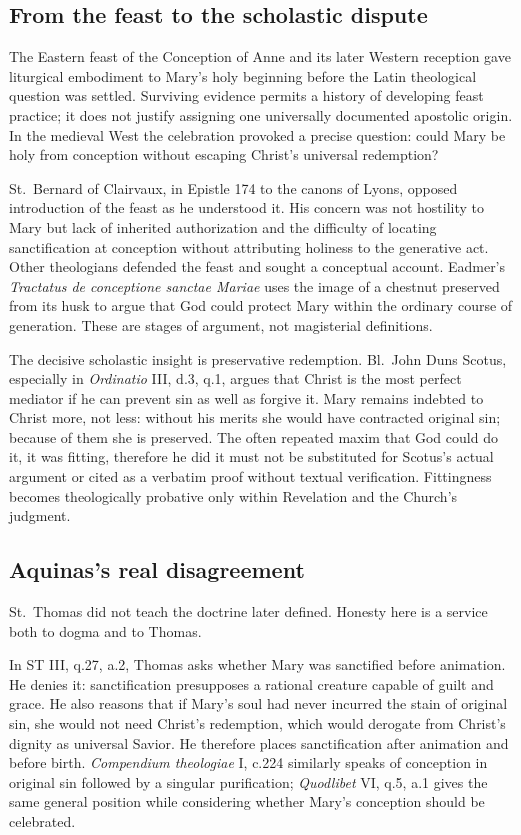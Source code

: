 \subsection{From the feast to the scholastic dispute}

The Eastern feast of the Conception of Anne and its later Western reception gave liturgical embodiment to Mary's holy beginning before the Latin theological question was settled. Surviving evidence permits a history of developing feast practice; it does not justify assigning one universally documented apostolic origin. In the medieval West the celebration provoked a precise question: could Mary be holy from conception without escaping Christ's universal redemption?

St.~Bernard of Clairvaux, in Epistle 174 to the canons of Lyons, opposed introduction of the feast as he understood it. His concern was not hostility to Mary but lack of inherited authorization and the difficulty of locating sanctification at conception without attributing holiness to the generative act. Other theologians defended the feast and sought a conceptual account. Eadmer's \emph{Tractatus de conceptione sanctae Mariae} uses the image of a chestnut preserved from its husk to argue that God could protect Mary within the ordinary course of generation. These are stages of argument, not magisterial definitions.

The decisive scholastic insight is preservative redemption. Bl.~John Duns Scotus, especially in \emph{Ordinatio} III, d.3, q.1, argues that Christ is the most perfect mediator if he can prevent sin as well as forgive it. Mary remains indebted to Christ more, not less: without his merits she would have contracted original sin; because of them she is preserved. The often repeated maxim that God could do it, it was fitting, therefore he did it must not be substituted for Scotus's actual argument or cited as a verbatim proof without textual verification. Fittingness becomes theologically probative only within Revelation and the Church's judgment.

\subsection{Aquinas's real disagreement}

St.~Thomas did not teach the doctrine later defined. Honesty here is a service both to dogma and to Thomas.

In ST III, q.27, a.2, Thomas asks whether Mary was sanctified before animation. He denies it: sanctification presupposes a rational creature capable of guilt and grace. He also reasons that if Mary's soul had never incurred the stain of original sin, she would not need Christ's redemption, which would derogate from Christ's dignity as universal Savior. He therefore places sanctification after animation and before birth. \emph{Compendium theologiae} I, c.224 similarly speaks of conception in original sin followed by a singular purification; \emph{Quodlibet} VI, q.5, a.1 gives the same general position while considering whether Mary's conception should be celebrated.

